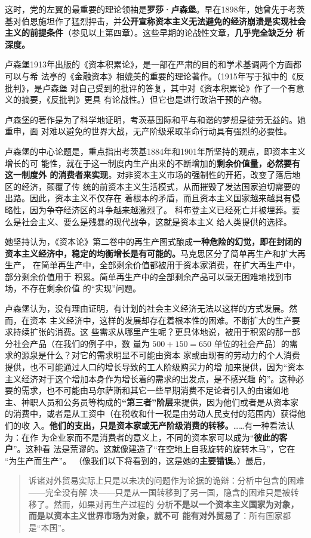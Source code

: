 这时，党的左翼的最重要的理论领袖是\textbf{罗莎·卢森堡}。早在1898年，她曾先于考茨
基对伯恩施坦作了猛烈抨击，并\textbf{公开宣称资本主义无法避免的经济崩溃是实现社会
  主义的前提条件}（参见以上第四章）。这些早期的论战性文章，\textbf{几乎完全缺乏分
  析深度。}

卢森堡1913年出版的《资本积累论》，是一部在严肃的目的和学术基调两个方面都可以与希
法亭的《金融资本》相媲美的重要的理论著作。（1915年写于狱中的《反批判》，是卢森堡
对自己受到的批评的答复，其中对《资本积累论》作了一个有意义的摘要，《反批判》更具
有论战性。）但它也是进行政治干预的产物。

卢森堡的著作是为了科学地证明，考茨基国际和平与和谐的梦想是徒劳无益的。她重申，面
对难以避免的世界大战，无产阶级采取革命行动具有强烈的必要性。

卢森堡的中心论题是，重点指出考茨基1884年和1901年所坚持的观点，即资本主义增长的可
能性，就在于这一制度内生产出来的不断增加的\textbf{剩余价值量，必然要有这一制度外
  的消费者来实现}。对非资本主义市场的强制性的开拓，改变了落后地区的经济，颠覆了传
统的前资本主义生活模式，从而摧毁了发达国家迫切需要的出路。因此，资本主义不仅存在
着根本的矛盾，而且资本主义国家越来越具有侵略性，因为争夺经济区的斗争越来越激烈了。
科布登主义已经死亡并被埋葬。要么是社会主义、要么是残暴的现代战争，这就是资本主义
给人类提供的选择。

她坚持认为，《资本论》第二卷中的再生产图式酿成\textbf{一种危险的幻觉，即在封闭的
  资本主义经济中，稳定的均衡增长是有可能的。}马克思区分了简单再生产和扩大再生产，
在简单再生产中，全部剩余价值都被用于资本家消费，在扩大再生产中，部分剩余价值用于
积累。简单再生产中的全部剩余产品可以毫无困难地找到市场，不存在剩余价值
的“实现”问题。

卢森堡认为，没有理由证明，有计划的社会主义经济无法以这样的方式发展。然而，在资本
主义经济中，这样的发展却存在着根本性的困难。不断扩大的生产要求持续扩张的消费。这
些需求从哪里产生呢？更具体地说，被用于积累的那一部分社会产品（在我们的例子中，数
量为 $500+150=650$ 单位的社会产品）的需求的源泉是什么？对它的需求明显不可能由资本
家或由现有的劳动力的个人消费提供，也不可能通过人口的增长导致的工人阶级购买力的增
加来提供，因为“资本主义经济对于这个增加本身作为增长着的需求的出发点，是不感兴趣
的”。这种必要的需求，也不可能由马尔萨斯和其它一些早期消费不足论者引入的由诸如地
主、神职人员和公务员等构成的\textbf{“第三者”阶层}来提供，因为他们或者是从资本家
的消费中，或者是从工资中（在税收和什一税是由劳动人民支付的范围内）获得他们的收
入。\textbf{他们的支出，只是资本家或无产阶级消费的转移。}……有一种看法认为：在作
为企业家而不是消费者的意义上，不同的资本家可以成为“\textbf{彼此的客户}”。这种看
法是荒谬的。这就像建造了“在空地上自我旋转的旋转木马”，它在 “为生产而生产”。
（像我们以下将看到的，这是她的\textbf{主要错误}。）最后，
\begin{quotation}
  诉诸对外贸易实际上只是以未决的问题作为论据的诡辩：分析中包含的困难——完全没有解
  决——只是从一国转移到了另一国，隐含的困难只是被转移了。然而，如果对再生产过程的
  分析\textbf{不是以一个资本主义国家为对象，而是以资本主义世界市场为对象，就不可
    能有对外贸易了}：所有国家都是“本国”。
\end{quotation}

